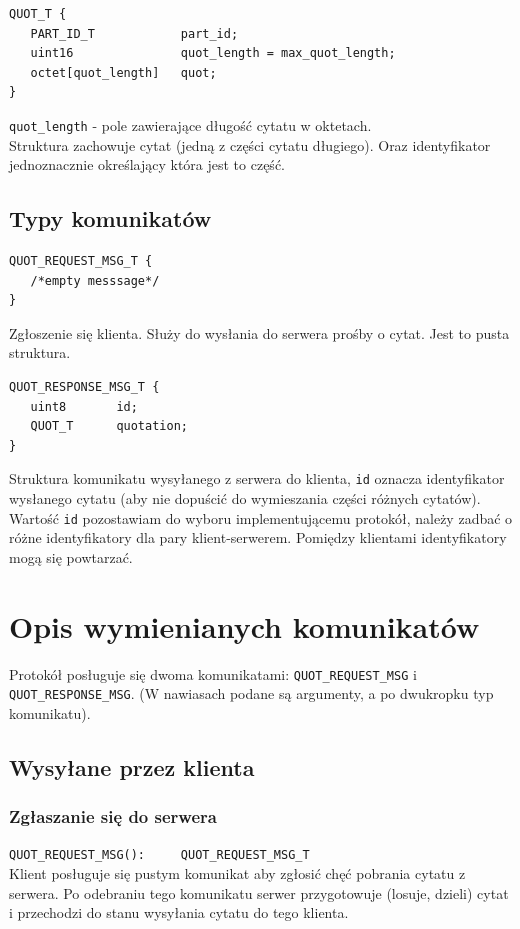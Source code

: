 \documentclass{article}
\begin{document}
\begin{verbatim}
QUOT_T {
   PART_ID_T            part_id;
   uint16               quot_length = max_quot_length;
   octet[quot_length]   quot;
}
\end{verbatim}
\verb+quot_length+ - pole zawierające długość cytatu w oktetach.\\
Struktura zachowuje cytat (jedną z części cytatu długiego). Oraz identyfikator jednoznacznie określający która jest to część.

\subsection{Typy komunikatów}
\begin{verbatim}
QUOT_REQUEST_MSG_T {
   /*empty messsage*/
}
\end{verbatim}
Zgłoszenie się klienta.
Służy do wysłania do serwera prośby o cytat. Jest to pusta struktura.

\begin{verbatim}
QUOT_RESPONSE_MSG_T {
   uint8       id;
   QUOT_T      quotation;
}
\end{verbatim}
Struktura komunikatu wysyłanego z serwera do klienta, \verb+id+ oznacza identyfikator wysłanego
cytatu (aby nie dopuścić do wymieszania części różnych cytatów). Wartość \verb+id+ pozostawiam do wyboru implementującemu
protokół, należy zadbać o różne identyfikatory dla pary klient-serwerem. Pomiędzy klientami
identyfikatory mogą się powtarzać.

\section{Opis wymienianych komunikatów}
Protokół posługuje się dwoma komunikatami: \verb+QUOT_REQUEST_MSG+ i \verb+QUOT_RESPONSE_MSG+. 
(W nawiasach podane są argumenty, a po dwukropku typ komunikatu).
\subsection{Wysyłane przez klienta}
\subsubsection{Zgłaszanie się do serwera}
\verb+QUOT_REQUEST_MSG():     QUOT_REQUEST_MSG_T+\\
Klient posługuje się pustym komunikat aby zgłosić chęć pobrania cytatu z serwera.
Po odebraniu tego komunikatu serwer przygotowuje (losuje, dzieli) cytat i przechodzi do stanu wysyłania cytatu do tego klienta.
\end{document}
